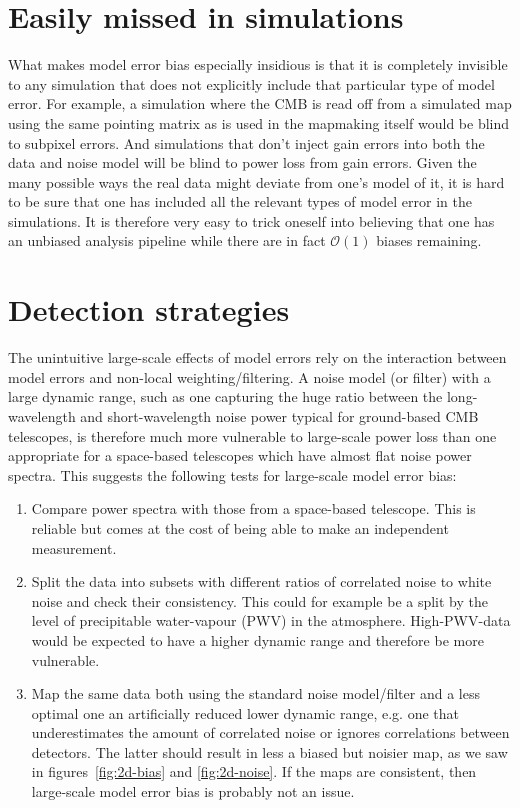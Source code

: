 \documentclass[twocolumn,apj]{aastex63}
\begin{document}
\section{Easily missed in simulations}
What makes model error bias especially insidious is that
it is completely invisible to any simulation that does not explicitly include
that particular type of model error. For example, a simulation where the CMB
is read off from a simulated map using the same pointing matrix as is used
in the mapmaking itself would be blind to subpixel errors. And simulations that
don't inject gain errors into both the data and noise model will be blind to
power loss from gain errors. Given the many
possible ways the real data might deviate from one's model of it, it is hard
to be sure that one has included all the relevant types of model error in the simulations.
It is therefore very easy to trick oneself into believing that one has an
unbiased analysis pipeline while there are in fact $\mathcal{O}(1)$ biases remaining.

\section{Detection strategies}
The unintuitive large-scale effects of model errors rely on the interaction
between model errors and non-local weighting/filtering. A noise model (or filter) with
a large dynamic range, such as one capturing the huge ratio between the long-wavelength
and short-wavelength noise power typical for ground-based CMB telescopes, is therefore
much more vulnerable to large-scale power loss than one appropriate for a
space-based telescopes which have almost flat noise power spectra. This suggests
the following tests for large-scale model error bias:
\begin{enumerate}
	\item Compare power spectra with those from a space-based telescope.
		This is reliable but comes at the cost of being able to make an independent measurement.
	\item Split the data into subsets with different ratios of correlated noise to white noise
		and check their consistency. This could for example be a split by the
		level of precipitable water-vapour (PWV) in the atmosphere. High-PWV-data
		would be expected to have a higher dynamic range and therefore be more vulnerable.
	\item Map the same data both using the standard noise model/filter and a
		less optimal one an artificially reduced lower dynamic range, e.g. one that
		underestimates the amount of correlated noise or ignores correlations between
		detectors. The latter should result in less a biased but noisier map, as we saw
		in figures~\ref{fig:2d-bias} and \ref{fig:2d-noise}.
		If the maps are consistent, then large-scale model error bias is probably not an issue.
\end{enumerate}
\end{document}

